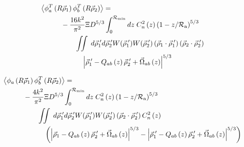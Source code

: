\begin{equation}\label{eqn:tphase_n7}
\begin{aligned}
&\left\langle \phi^{T}_{a}\left(R\vec{\rho}_{1}\right) \phi^{T}_{b}\left(R\vec{\rho}_{2}\right)\right\rangle = \\
&\quad\quad\quad
-\frac{16k^{2}}{\pi^{2}} 
\Xi D^{5/3}
\int_{0}^{\mathcal{R}_{\rm min}} dz\;C_{n}^{2}\left(z\right) \left(1 - z/\mathcal{R}_{\rm a}\right)^{5/3}\\
& \quad\quad\quad\quad\quad
\iint \; d\vec{\rho}^{\;\prime}_{1}d\vec{\rho}^{\;\prime}_{2} W(\vec{\rho}^{\;\prime}_{1}) W(\vec{\rho}^{\;\prime}_{2})
\left(\vec{\rho}_{1} \cdot \vec{\rho}^{\;\prime}_{1}\right)
\left(\vec{\rho}_{2} \cdot \vec{\rho}^{\;\prime}_{2}\right)
\\
&\quad\quad\quad\quad\quad\quad
\left\vert \vec{\rho}^{\;\prime}_{1} - Q_{ab}\left(z\right) \vec{\rho}^{\;\prime}_{2} + \vec{\Omega}_{ab}\left(z\right)\right\vert^{5/3}
\end{aligned}
\end{equation}

\begin{equation}\label{eqn:tprphase_n7}
\begin{aligned}
&\left\langle \phi_{a}\left(R\vec{\rho}_{1}\right) \phi^{T}_{b}\left(R\vec{\rho}_{2}\right)\right\rangle = \\
&\quad\quad\quad
-\frac{4k^{2}}{\pi^{2}} 
\Xi D^{5/3}
\int_{0}^{\mathcal{R}_{\rm min}} dz\;C_{n}^{2}\left(z\right) \left(1 - z/\mathcal{R}_{\rm a}\right)^{5/3}\\
& \quad\quad\quad\quad\quad
\iint  \; d\vec{\rho}^{\;\prime}_{1}d\vec{\rho}^{\;\prime}_{2} W(\vec{\rho}^{\;\prime}_{1}) W(\vec{\rho}^{\;\prime}_{2})
\left(\vec{\rho}_{2} \cdot \vec{\rho}^{\;\prime}_{2}\right)
C_{n}^{2}\left(z\right) 
\\
&\quad\quad\quad\quad\quad\quad
\left(
\left\vert \vec{\rho}_{1} - Q_{ab}\left(z\right)\vec{\rho}^{\;\prime}_{2} + \vec{\Omega}_{ab}\left(z\right) \right\vert^{5/3}
- \left\vert \vec{\rho}^{\;\prime}_{1}  -  Q_{ab}\left(z\right)\vec{\rho}^{\;\prime}_{2} + \vec{\Omega}_{ab}\left(z\right)  \right\vert^{5/3}
\right)
\end{aligned}
\end{equation}
